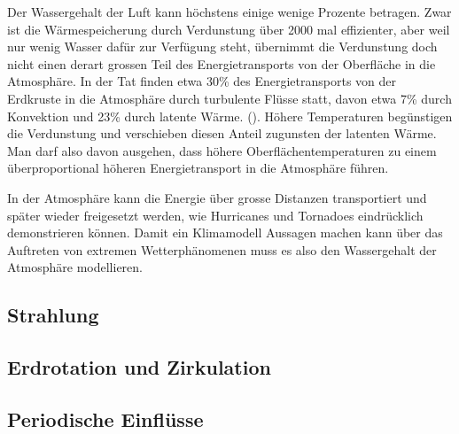 Der Wassergehalt der Luft kann höchstens einige wenige Prozente betragen.
Zwar ist die Wärmespeicherung durch Verdunstung über 2000 mal effizienter,
aber weil nur wenig Wasser dafür zur Verfügung steht, übernimmt die Verdunstung
doch nicht einen derart grossen Teil des Energietransports von der
Oberfläche in die Atmosphäre.
In der Tat finden etwa 30\% des Energietransports von der Erdkruste
in die Atmosphäre durch turbulente Flüsse statt, davon etwa
7\% durch Konvektion und 23\% durch latente Wärme.
(\cite[S.~70]{skript:wiefunktioniertdas}).
Höhere Temperaturen begünstigen die Verdunstung und verschieben diesen
Anteil zugunsten der latenten Wärme.
Man darf also davon ausgehen, dass höhere Oberflächentemperaturen
zu einem überproportional höheren Energietransport in die Atmosphäre
führen.

In der Atmosphäre kann die Energie über grosse Distanzen transportiert
und später wieder freigesetzt werden, wie Hurricanes und Tornadoes
eindrücklich demonstrieren können.
Damit ein Klimamodell Aussagen machen kann über das Auftreten von
extremen Wetterphänomenen muss es also den Wassergehalt der
Atmosphäre modellieren.

\subsection{Strahlung}

\subsection{Erdrotation und Zirkulation}

\subsection{Periodische Einflüsse}

